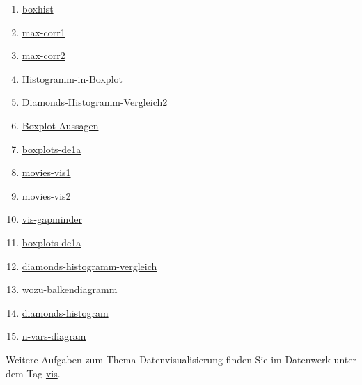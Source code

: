 \documentclass[
  letterpaper,
  twoside,
  open=any]{scrbook}
\providecommand{\tightlist}{%
  \setlength{\itemsep}{0pt}\setlength{\parskip}{0pt}}\usepackage{longtable,booktabs,array}
\theoremstyle{definition}
\theoremstyle{definition}
\theoremstyle{definition}
\theoremstyle{remark}
\begin{document}
\begin{enumerate}
\def\labelenumi{\arabic{enumi}.}
\tightlist
\item
  \href{https://sebastiansauer.github.io/Datenwerk/posts/boxhist/boxhist.html}{boxhist}
\item
  \href{https://sebastiansauer.github.io/Datenwerk/posts/max-corr1/max-corr1.html}{max-corr1}
\item
  \href{https://sebastiansauer.github.io/Datenwerk/posts/max-corr2/max-corr2.html}{max-corr2}
\item
  \href{https://sebastiansauer.github.io/Datenwerk/posts/histogramm-in-boxplot/histogramm-in-boxplot}{Histogramm-in-Boxplot}
\item
  \href{https://sebastiansauer.github.io/Datenwerk/posts/diamonds-histogramm-vergleich2/diamonds-histogramm-vergleich2}{Diamonds-Histogramm-Vergleich2}
\item
  \href{https://sebastiansauer.github.io/Datenwerk/posts/boxplot-aussagen/boxplot-aussagen}{Boxplot-Aussagen}
\item
  \href{https://sebastiansauer.github.io/Datenwerk/posts/boxplots-de1a/boxplots-de1a.html}{boxplots-de1a}
\item
  \href{https://sebastiansauer.github.io/Datenwerk/posts/movies-vis1/movies-vis1.html}{movies-vis1}
\item
  \href{https://sebastiansauer.github.io/Datenwerk/posts/movies-vis2/movies-vis2.html}{movies-vis2}
\item
  \href{https://sebastiansauer.github.io/Datenwerk/posts/vis-gapminder/vis-gapminder}{vis-gapminder}
\item
  \href{https://sebastiansauer.github.io/Datenwerk/posts/boxplots-de1a/boxplots-de1a}{boxplots-de1a}
\item
  \href{https://sebastiansauer.github.io/Datenwerk/posts/diamonds-histogramm-vergleich/diamonds-histogramm-vergleich}{diamonds-histogramm-vergleich}
\item
  \href{https://sebastiansauer.github.io/Datenwerk/posts/wozu-balkendiagramm/wozu-balkendiagramm}{wozu-balkendiagramm}
\item
  \href{https://sebastiansauer.github.io/Datenwerk/posts/diamonds-histogram/diamonds-histogram}{diamonds-histogram}
\item
  \href{https://sebastiansauer.github.io/Datenwerk/posts/n-vars-diagram/n-vars-diagram}{n-vars-diagram}
\end{enumerate}

Weitere Aufgaben zum Thema Datenvisualisierung finden Sie im Datenwerk
unter dem Tag
\href{https://sebastiansauer.github.io/Datenwerk/\#category=vis}{vis}.
\end{document}

